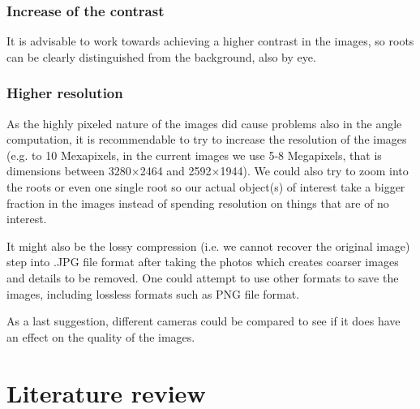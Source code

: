 \subsection{Increase of the contrast}

It is advisable to work towards achieving a higher contrast in the images, so roots can be clearly distinguished from the background, also by eye.




\subsection{Higher resolution}


As the highly pixeled nature of the images did cause problems also in the angle computation, it is recommendable to try to increase the resolution of the images (e.g. to 10 Mexapixels, in the current images we use 5-8 Megapixels, that is dimensions between 3280\(\times\)2464 and 2592\(\times\)1944). We could also try to zoom into the roots or even one single root so our actual object(s) of interest take a bigger fraction in the images instead of spending resolution on things that are of no interest. 

It might also be the lossy compression (i.e. we cannot recover the original image) step into .JPG file format after taking the photos which creates coarser images and details to be removed.
One could attempt to use other formats to save the images, including lossless formats such as PNG file format.

As a last suggestion, different cameras could be compared to see if it does have an effect on the quality of the images. 



\chapter{Literature review}\label{litreview}
